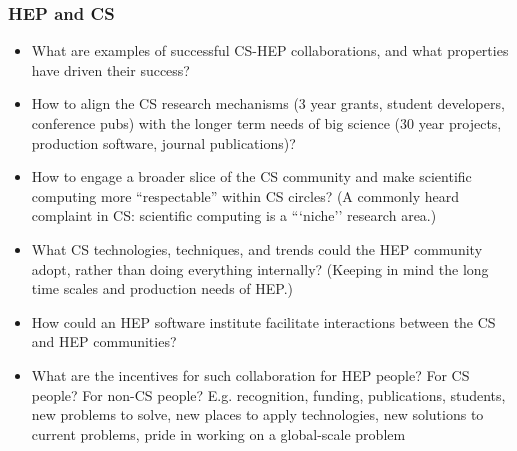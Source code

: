 \begin{frame}
\frametitle{HEP and CS}

\footnotesize{
\begin{itemize}
\item What are examples of successful CS-HEP collaborations, and what properties have driven their success?
\item How to align the CS research mechanisms (3 year grants, student developers, conference pubs) with the longer term needs of big science (30 year projects, production software, journal publications)?
\item How to engage a broader slice of the CS community and make scientific computing more “respectable” within CS circles?  (A commonly heard complaint in CS: scientific computing is a ```niche'' research area.)
\item What CS technologies, techniques, and trends could the HEP community adopt, rather than doing everything internally?  (Keeping in mind the long time scales and production needs of HEP.)
\item How could an HEP software institute facilitate interactions between the CS and HEP communities? 
\item What are the incentives for such collaboration for HEP people?  For CS people?  For non-CS people?  E.g. recognition, funding, publications, students, new problems to solve, new places to apply technologies, new solutions to current problems, pride in working on a global-scale problem
\end{itemize}
}

\end{frame}


